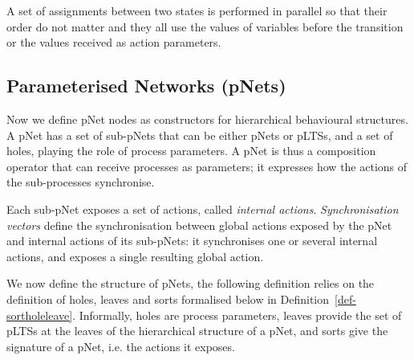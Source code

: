 \documentclass{elsarticle}
\begin{document}
A set of assignments between two states is performed in parallel so that their order do not matter and they all use the values of variables before the transition or the values received as action parameters.

\subsection{Parameterised Networks (pNets)}
\label{section:pnets}

Now we define
pNet nodes as constructors for hierarchical behavioural structures.
A pNet has a set of sub-pNets that can be either pNets or pLTSs, and a
set of holes, playing the role of process parameters. A pNet is thus a composition operator that can receive processes as parameters; it expresses how the actions of the sub-processes synchronise.

Each sub-pNet exposes
a set of actions, called \emph{internal actions}. \emph{Synchronisation vectors} define the synchronisation between global actions exposed by the pNet and
internal actions of its sub-pNets: it synchronises one or several internal actions, and
exposes a single resulting global action.
 

We now define the structure of pNets, the following definition relies on the definition 
of holes, leaves and sorts formalised below in Definition~\ref{def-sortholeleave}. Informally, holes are process parameters, leaves provide the set of pLTSs at the leaves of the hierarchical structure of a pNet, and sorts give the signature of a pNet, i.e. the actions it exposes.
\end{document}
